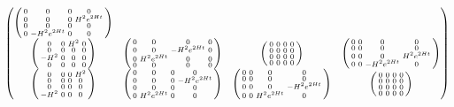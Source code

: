 \documentclass{article}
\begin{document}
$$\begin{pmatrix}
\begin{psmallmatrix}
					0 & 0 & 0 & 0 \\
					0 & 0 & 0 & H^2 e^{2Ht} \\
					0 & 0 & 0 & 0 \\
					0 & -H^2 e^{2Ht} & 0 & 0
				\end{psmallmatrix} \\
				\begin{psmallmatrix}
					0 & 0 & H^2 & 0 \\
					0 & 0 & 0 & 0 \\
					-H^2 & 0 & 0 & 0 \\
					0 & 0 & 0 & 0
				\end{psmallmatrix} & 
				\begin{psmallmatrix}
					0 & 0 & 0 & 0 \\
					0 & 0 & -H^2e^{2Ht} & 0 \\
					0 & H^2e^{2Ht} & 0 & 0 \\
					0 & 0 & 0 & 0
				\end{psmallmatrix} &
				\begin{psmallmatrix}
					0 & 0 & 0 & 0 \\
					0 & 0 & 0 & 0 \\
					0 & 0 & 0 & 0 \\
					0 & 0 & 0 & 0
				\end{psmallmatrix} &
				\begin{psmallmatrix}
					0 & 0 & 0 & 0 \\
					0 & 0 & 0 & 0 \\
					0 & 0 & 0 & H^2 e^{2Ht} \\
					0 & 0 & -H^2 e^{2Ht} & 0
				\end{psmallmatrix}  \\
				\begin{psmallmatrix}
					0 & 0 & 0 & H^2 \\
					0 & 0 & 0 & 0 \\
					0 & 0 & 0 & 0 \\
					-H^2 & 0 & 0 & 0
				\end{psmallmatrix} & 
				\begin{psmallmatrix}
					0 & 0 & 0 & 0 \\
					0 & 0 & 0 & -H^2e^{2Ht} \\
					0 & 0 & 0 & 0 \\
					0 & H^2e^{2Ht} & 0 & 0
				\end{psmallmatrix} &
				\begin{psmallmatrix}
					0 & 0 & 0 & 0 \\
					0 & 0 & 0 & 0 \\
					0 & 0 & 0 & -H^2 e^{2Ht} \\
					0 & 0 & H^2e^{2Ht} & 0
				\end{psmallmatrix} &
				\begin{psmallmatrix}
					0 & 0 & 0 & 0 \\
					0 & 0 & 0 & 0 \\
					0 & 0 & 0 & 0 \\
					0 & 0 & 0 & 0
				\end{psmallmatrix}
			\end{pmatrix}
		$$
\end{document}
